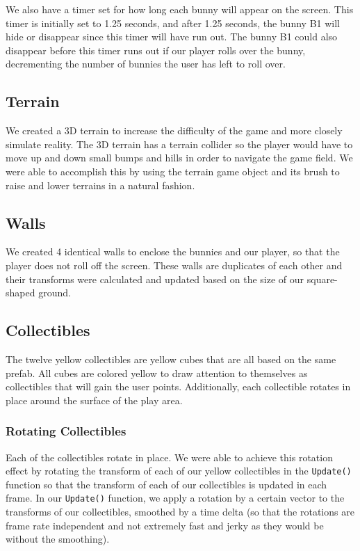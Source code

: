 \documentclass[12pt]{article}
\begin{document}
  We also have a timer set for how long each bunny will appear on the screen. This timer is initially set to 1.25 seconds, and after 1.25 seconds, the bunny B1 will hide or disappear since this timer will have run out. The bunny B1 could also disappear before this timer runs out if our player rolls over the bunny, decrementing the number of bunnies the user has left to roll over.


\subsection{Terrain}
  We created a 3D terrain to increase the difficulty of the game and more closely simulate reality. The 3D terrain has a terrain collider so the player would have to move up and down small bumps and hills in order to navigate the game field. We were able to accomplish this by using the terrain game object and its brush to raise and lower terrains in a natural fashion.

\subsection{Walls}
  We created 4 identical walls to enclose the bunnies and our player, so that the player does not roll off the screen. These walls are duplicates of each other and their transforms were calculated and updated based on the size of our square-shaped ground.

\subsection{Collectibles}
  The twelve yellow collectibles are yellow cubes that are all based on the same prefab. All cubes are colored yellow to draw attention to themselves as collectibles that will gain the user points. Additionally, each collectible rotates in place around the surface of the play area.

\subsubsection{Rotating Collectibles}
  Each of the collectibles rotate in place. We were able to achieve this rotation effect by rotating the transform of each of our yellow collectibles in the \verb+Update()+ function so that the transform of each of our collectibles is updated in each frame. In our \verb+Update()+ function, we apply a rotation by a certain vector to the transforms of our collectibles, smoothed by a time delta (so that the rotations are frame rate independent and not extremely fast and jerky as they would be without the smoothing).
\end{document}
